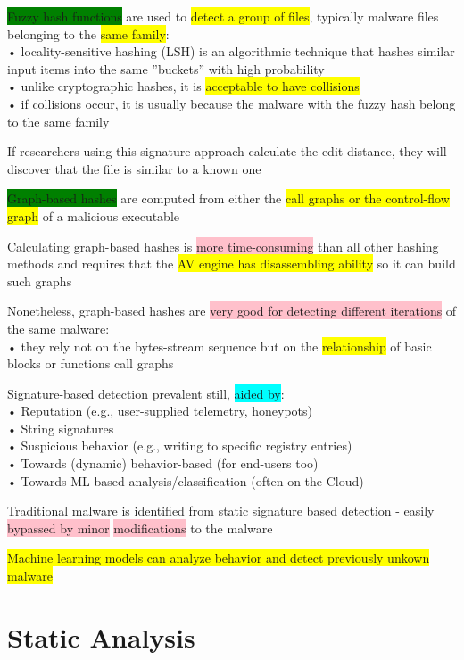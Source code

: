 \documentclass[]{project_plan}
\begin{document}
\colorbox{green}{Fuzzy hash functions} are used to \colorbox{yellow}{detect a group of files}, typically malware files
belonging to the \colorbox{yellow}{same family}:\\
• locality-sensitive hashing (LSH) is an algorithmic technique that hashes similar input
items into the same ”buckets” with high probability\\
• unlike cryptographic hashes, it is \colorbox{yellow}{acceptable to have collisions}\\
• if collisions occur, it is usually because the malware with the fuzzy hash belong to the
same family

If researchers using this signature approach calculate the edit distance, they will
discover that the file is similar to a known one

\colorbox{green}{Graph-based hashes} are computed from either the \colorbox{yellow}{call graphs or the control-flow
  graph} of a malicious executable

Calculating graph-based hashes is \colorbox{pink}{more time-consuming} than all other hashing
methods and requires that the \colorbox{yellow}{AV engine has disassembling ability} so it can build
such graphs

Nonetheless, graph-based hashes are \colorbox{pink}{very good for detecting different iterations} of
the same malware:\\
• they rely not on the bytes-stream sequence but on the \colorbox{yellow}{relationship} of basic blocks or
functions call graphs

Signature-based detection prevalent still, \colorbox{cyan}{aided by}:\\
• Reputation (e.g., user-supplied telemetry, honeypots)\\
• String signatures\\
• Suspicious behavior (e.g., writing to specific registry entries)\\
• Towards (dynamic) behavior-based (for end-users too)\\
• Towards ML-based analysis/classification (often on the Cloud)

Traditional malware is identified from static signature based detection - easily
\colorbox{pink}{bypassed by minor} \colorbox{pink}{modifications} to the malware

\colorbox{yellow}{Machine learning models can analyze behavior and detect previously unkown malware}

\section{Static Analysis}
\end{document}
